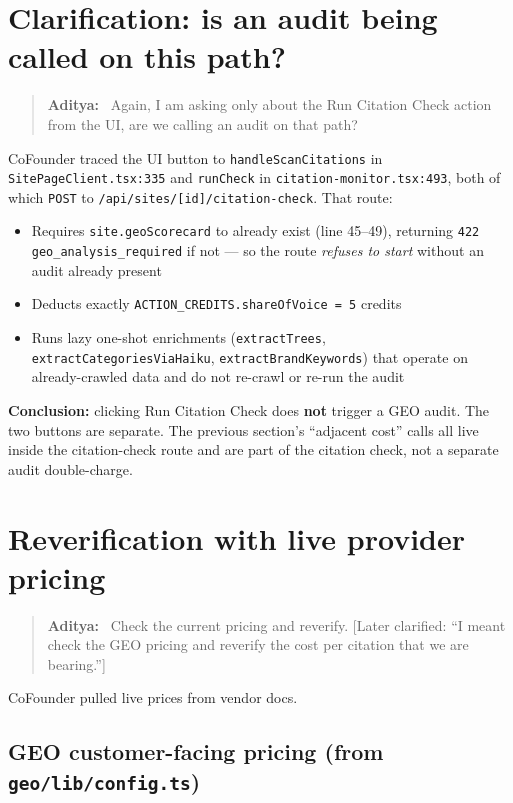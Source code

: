 \documentclass[11pt,letterpaper]{article}
\newenvironment{userturn}
  {\begin{quote}\small\color{brand}\textbf{Aditya:}~}
  {\end{quote}}
\begin{document}
\section{Clarification: is an audit being called on this path?}

\begin{userturn}
Again, I am asking only about the Run Citation Check action from the UI,
are we calling an audit on that path?
\end{userturn}

CoFounder traced the UI button to \texttt{handleScanCitations} in
\texttt{SitePageClient.tsx:335} and \texttt{runCheck} in
\texttt{citation-monitor.tsx:493}, both of which \texttt{POST} to
\texttt{/api/sites/[id]/citation-check}. That route:

\begin{itemize}[nosep]
  \item Requires \texttt{site.geoScorecard} to already exist (line 45--49),
    returning \texttt{422 geo\_analysis\_required} if not --- so the route
    \textit{refuses to start} without an audit already present
  \item Deducts exactly \texttt{ACTION\_CREDITS.shareOfVoice = 5} credits
  \item Runs lazy one-shot enrichments (\texttt{extractTrees},
    \texttt{extractCategoriesViaHaiku}, \texttt{extractBrandKeywords}) that
    operate on already-crawled data and do not re-crawl or re-run the audit
\end{itemize}

\textbf{Conclusion:} clicking Run Citation Check does \textbf{not} trigger a
GEO audit. The two buttons are separate. The previous section's ``adjacent
cost'' calls all live inside the citation-check route and are part of the
citation check, not a separate audit double-charge.

\section{Reverification with live provider pricing}

\begin{userturn}
Check the current pricing and reverify. [Later clarified: ``I meant check
the GEO pricing and reverify the cost per citation that we are bearing.'']
\end{userturn}

CoFounder pulled live prices from vendor docs.

\subsection{GEO customer-facing pricing (from \texttt{geo/lib/config.ts})}
\end{document}

